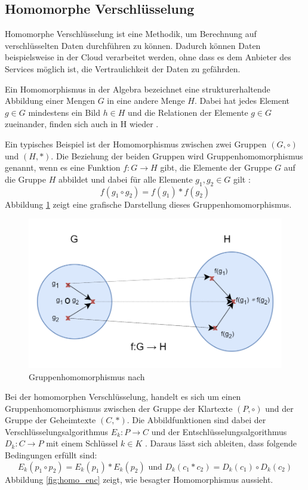 \subsection{Homomorphe Verschlüsselung}\label{sec:homomorphe_verschlüsselung}

Homomorphe Verschlüsselung ist eine Methodik, um Berechnung auf verschlüsselten Daten durchführen zu können. Dadurch können Daten beispielsweise in der Cloud verarbeitet werden, ohne dass es dem Anbieter des Services möglich ist, die Vertraulichkeit der Daten zu gefährden.

Ein Homomorphismus in der Algebra bezeichnet eine strukturerhaltende Abbildung einer Mengen $G$ in eine andere Menge $H$.
Dabei hat jedes Element $g \in G $ mindestens ein Bild $h \in H$ und die Relationen der Elemente $g \in G$ zueinander, finden sich auch in H wieder \cite{B-2}.

Ein typisches Beispiel ist der Homomorphismus zwischen zwei Gruppen $(G,\circ)$ und $(H,\ast)$. 
Die Beziehung der beiden Gruppen wird Gruppenhomomorphismus genannt, wenn es eine Funktion $f:G\to H$ gibt, die Elemente der Gruppe $G$ auf die Gruppe $H$ abbildet und dabei für alle Elemente $g_1,g_2 \in G$ gilt \cite{P-98}:
\begin{equation*}
    f(g_1 \circ g_2) = f(g_1) \ast f(g_2)
\end{equation*}
Abbildung \ref{fig:group_homomorphismus} zeigt eine grafische Darstellung dieses Gruppenhomomorphismus.

\begin{figure}[!htb]
    \centering
    \includegraphics[width=12cm]{figures/group_homomophismus.png}
    \caption{Gruppenhomomorphismus nach \cite{P-98}}
    \label{fig:group_homomorphismus}
\end{figure} 

Bei der homomorphen Verschlüsselung, handelt es sich um einen Gruppenhomomorphismus zwischen der Gruppe der Klartexte $(P,\circ)$ und der Gruppe der Geheimtexte $(C,\ast)$. 
Die Abbildfunktionen sind dabei der Verschlüsselungsalgorithmus $E_k:P\to C$ und der Entschlüsselungsalgorithmus $D_k:C\to P$ mit einem Schlüssel $k \in K$ \cite{P-98}. 
Daraus lässt sich ableiten, dass folgende Bedingungen erfüllt sind:
\begin{equation*}
    E_k(p_1 \circ p_2) = E_k(p_1) \ast E_k(p_2)  \text{ und } D_k(c_1 \ast c_2) = D_k(c_1) \circ D_k(c_2)
\end{equation*}
Abbildung \ref{fig:homo_enc} zeigt, wie besagter Homomorphismus aussieht.

